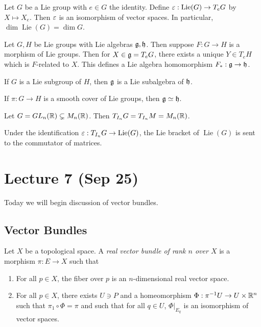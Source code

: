 \documentclass[twoside, 10pt]{article}
\begin{document}
    \begin{thm}
        Let $G$ be a Lie group with $e \in G$ the identity. Define $\varepsilon: \operatorname{Lie}(G) \to T_e G$ by $X \mapsto X_e$. Then $\varepsilon$ is an isomorphism of vector spaces. In particular, $\dim \operatorname{Lie}(G) = \dim G$.
    \end{thm}

    \begin{thm}
        Let $G,H$ be Lie groups with Lie algebras $\mathfrak{g}, \mathfrak{h}$. Then suppose $F: G \to H$ is a morphism of Lie groups. Then for $X \in \mathfrak{g} = T_{e}G$, there exists a unique $Y \in T_eH$ which is $F$-related to $X$. This defines a Lie algebra homomorphism $F_*: \mathfrak{g} \to \mathfrak{h}$.
    \end{thm}

    \begin{cor}
        If $G$ is a Lie subgroup of $H$, then $\mathfrak{g}$ is a Lie subalgebra of $\mathfrak{h}$.
    \end{cor}

    \begin{cor}
        If $\pi:G \to H$ is a smooth cover of Lie groups, then $\mathfrak{g} \simeq \mathfrak{h}$.
    \end{cor}

    \begin{exm}
        Let $G = GL_n(\mathbb{R}) \subsetneq M_n(\mathbb{R})$. Then $T_{I_n}G = T_{I_n}M = M_n(\mathbb{R})$.
    \end{exm}

    \begin{prop}
        Under the identification $\varepsilon: T_{I_n}G \to \operatorname{Lie}(G)$, the Lie bracket of $\operatorname{Lie}(G)$ is sent to the commutator of matrices.
    \end{prop}

    \section{Lecture 7 (Sep 25)}%
    \label{sec:lecture_7_sep_25_}
    
    Today we will begin discussion of vector bundles.

    \subsection{Vector Bundles}%
    \label{sub:vector_bundles}
    
    \begin{defn}
        Let $X$ be a topological space. A \textit{real vector bundle of rank $n$ over $X$} is a morphism $\pi:E \to X$ such that
        \begin{enumerate}
            \item For all $p \in X$, the fiber over $p$ is an $n$-dimensional real vector space.
            \item For all $p \in X$, there exists $U \ni P$ and a homeomorphism $\Phi:\pi^{-1}U \to U \times \mathbb{R}^n$ such that $\pi_1 \circ \Phi = \pi$ and such that for all $q \in U$, $\Phi|_{E_q}$ is an isomorphism of vector spaces.
        \end{enumerate}
    \end{defn}
\end{document}
